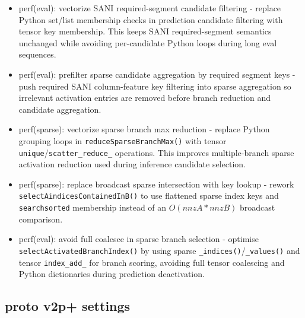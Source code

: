 \begin{itemize}
 	\item perf(eval): vectorize SANI required-segment candidate filtering
			- replace Python set/list membership checks in prediction candidate filtering with tensor key membership. This keeps SANI required-segment semantics unchanged while avoiding per-candidate Python loops during long eval sequences.
 	\item perf(eval): prefilter sparse candidate aggregation by required segment keys
			- push required SANI column-feature key filtering into sparse aggregation so irrelevant activation entries are removed before branch reduction and candidate aggregation.
 	\item perf(sparse): vectorize sparse branch max reduction
			- replace Python grouping loops in \texttt{reduceSparseBranchMax()} with tensor \texttt{unique}/\texttt{scatter_reduce_} operations. This improves multiple-branch sparse activation reduction used during inference candidate selection.
 	\item perf(sparse): replace broadcast sparse intersection with key lookup
			- rework \texttt{selectAindicesContainedInB()} to use flattened sparse index keys and \texttt{searchsorted} membership instead of an $O(nnzA * nnzB)$ broadcast comparison.
 	\item perf(eval): avoid full coalesce in sparse branch selection
			- optimise \texttt{selectActivatedBranchIndex()} by using sparse \texttt{_indices()}/\texttt{_values()} and tensor \texttt{index_add_} for branch scoring, avoiding full tensor coalescing and Python dictionaries during prediction deactivation.
\end{itemize}

\subsection{proto v2p+ settings}

